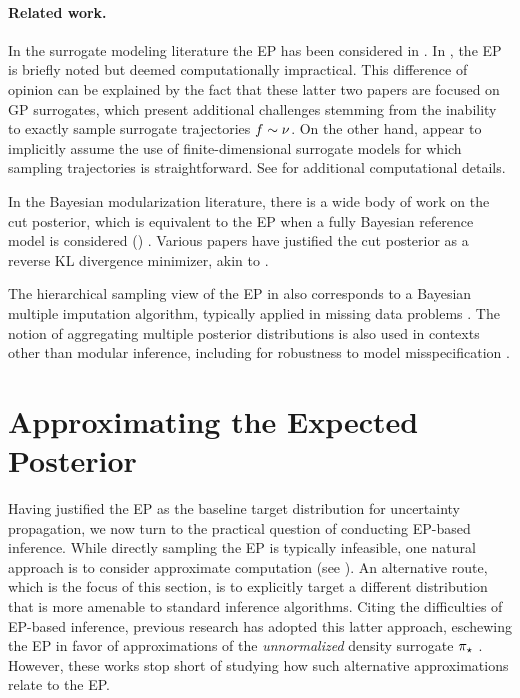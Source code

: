 \documentclass[12pt]{article}
\begin{document}
\paragraph{Related work.} In the surrogate modeling literature the EP has been considered 
in \citet{trainDynamics,BurknerSurrogate,garegnani2021NoisyMCMC}. In 
\citet{StuartTeck2,VehtariParallelGP}, the EP is briefly noted but deemed computationally impractical. 
This difference of opinion can be explained by the fact that these latter two papers are focused 
on GP surrogates, which present additional challenges stemming from the inability to exactly 
sample surrogate trajectories $f \sim \nu$. On the other hand, 
\citet{BurknerSurrogate,garegnani2021NoisyMCMC} appear to implicitly assume the use of 
finite-dimensional surrogate models for which sampling trajectories is straightforward.
See  for additional computational details.

In the Bayesian modularization literature, there is a wide body of work 
on the cut posterior, which is equivalent to the EP 
when a fully Bayesian reference model is considered ()
\citep{PlummerCut,cutInference,moduleModels}.
Various papers have justified the cut posterior as a reverse KL divergence minimizer, 
akin to  \citep{cutVar,cutVar2,moduleModels}. 

The hierarchical sampling view of the EP in  also 
corresponds to a Bayesian multiple imputation algorithm, typically applied
in missing data problems \citep{multipleImputationMedical,missingData}.
The notion of aggregating multiple posterior distributions is also used in 
contexts other than modular inference, including for robustness to model 
misspecification \citep{BayesBag,BayesBag2}.

\section{Approximating the Expected Posterior} \label{sec:approximating-ep}
Having justified the EP as the baseline target distribution for uncertainty 
propagation, we now turn to the practical question of conducting EP-based
inference. While directly sampling the EP is typically infeasible, one natural 
approach is to consider approximate computation (see ).
An alternative route, which is the focus of this section, is to explicitly target a
different distribution that is more amenable to standard inference algorithms.
Citing the difficulties of EP-based inference, previous research has 
adopted this latter approach, 
eschewing the EP in favor of approximations of the \textit{unnormalized}
density surrogate ${\pi}_{\star}$ \citep{StuartTeck1,StuartTeck2,VehtariParallelGP}.
However, these works stop short of studying how such alternative approximations 
relate to the EP. 
\end{document}
